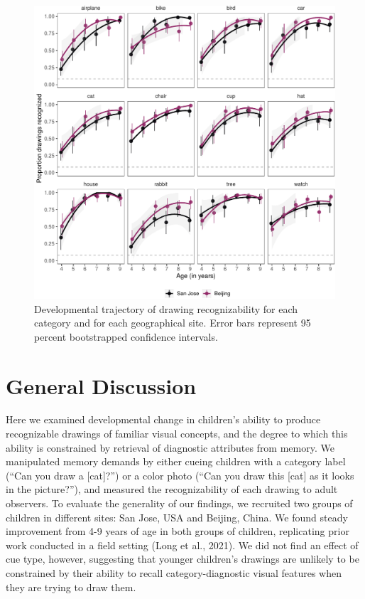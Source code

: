 \documentclass[
  english,
  man]{apa6}
\begin{document}
\begin{figure}[H]

{\centering \includegraphics[width=\textwidth]{figs/item-effects-1} 

}

\caption{Developmental trajectory of drawing recognizability for each category and for each geographical site. Error bars represent 95 percent bootstrapped confidence intervals.}\label{fig:item-effects}
\end{figure}

\hypertarget{general-discussion}{%
\section{General Discussion}\label{general-discussion}}

Here we examined developmental change in children's ability to produce recognizable drawings of familiar visual concepts, and the degree to which this ability is constrained by retrieval of diagnostic attributes from memory.
We manipulated memory demands by either cueing children with a category label (\enquote{Can you draw a {[}cat{]}?}) or a color photo (\enquote{Can you draw this {[}cat{]} as it looks in the picture?}), and measured the recognizability of each drawing to adult observers.
To evaluate the generality of our findings, we recruited two groups of children in different sites: San Jose, USA and Beijing, China.
We found steady improvement from 4-9 years of age in both groups of children, replicating prior work conducted in a field setting (Long et al., 2021).
We did not find an effect of cue type, however, suggesting that younger children's drawings are unlikely to be constrained by their ability to recall category-diagnostic visual features when they are trying to draw them.
\end{document}
